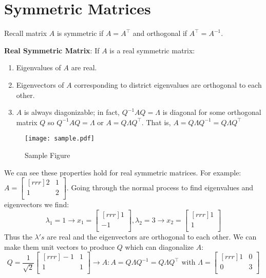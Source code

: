 \section{Symmetric Matrices}

Recall matrix $A$ is symmetric if $A=A^\intercal$ and orthogonal if $A^\intercal = A^{-1}$.

\begin{definition}
  \textbf{Real Symmetric Matrix}: If $A$ is a real symmetric matrix:
    \begin{enumerate}
      \item Eigenvalues of $A$ are real.
      \item Eigenvectors of $A$ corresponding to district eigenvalues are orthogonal to each other.
      \item $A$ is always diagonizable; in fact, $Q^{-1}AQ=\Lambda$ is diagonal for some orthogonal matrix $Q$ so $Q^{-1}AQ=\Lambda$ or $A=Q \Lambda Q^\intercal$. That is, $A=Q \Lambda Q^{-1}=Q \Lambda Q^\intercal$
    \end{enumerate}
\end{definition}

\begin{figure}[h]
\caption{Sample Figure}\label{figure}
\begin{center}
\texttt{[image: sample.pdf]}
\end{center}
\end{figure}

\begin{example}
  We can see these properties hold for real symmetric matrices. For example:
  $A = \begin{bmatrix}[rrr]
   2 & 1 \\
   1 & 2 \\
  \end{bmatrix}$. Going through the normal process to find eigenvalues and eigenvectors we find:
  \[\lambda_1=1 \rightarrow x_1= \begin{bmatrix}[rrr]
    1 \\
    -1 \\
   \end{bmatrix}, \lambda_2=3 \rightarrow x_2= \begin{bmatrix}[rrr]
    1 \\
    1 \\
   \end{bmatrix}\]
  Thus the $\lambda's$ are real and the eigenvectors are orthogonal to each other. We can make them unit vectors to produce $Q$ which can diagonalize $A$:
  \[Q=\frac{1}{\sqrt{2}} \begin{bmatrix}[rrr]
    -1 & 1 \\
    1 & 1 \\
  \end{bmatrix} \rightarrow A: A=Q\Lambda Q^{-1}=Q\Lambda Q^\intercal \text{ with } \Lambda = \begin{bmatrix}[rrr]
   1 & 0 \\
   0 & 3 \\
 \end{bmatrix} \]
\end{example}

